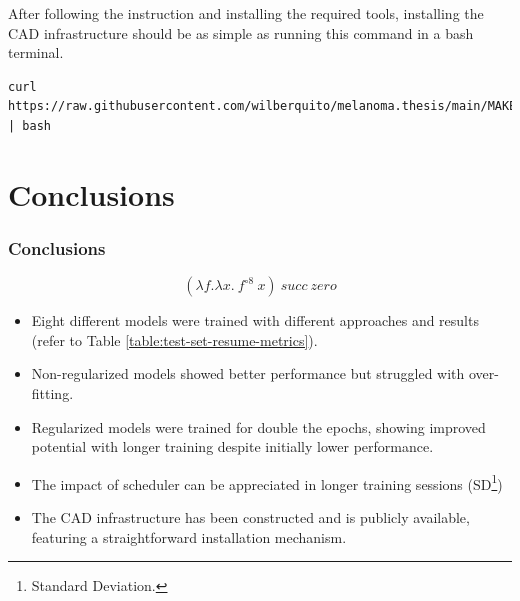\documentclass[dvipsnames,mathserif]{beamer}
\begin{document}
{\begin{frame}[fragile]
      After following the instruction and installing the required tools, installing the CAD infrastructure should
      be as simple as running this command in a bash terminal.

      \vspace{0.1cm}

      \begin{Verbatim}[fontsize=\tiny]
curl https://raw.githubusercontent.com/wilberquito/melanoma.thesis/main/MAKE.sh | bash
      \end{Verbatim}

    \end{frame}


    \section{Conclusions}


    \begin{frame}
      \frametitle{Conclusions}


      \[(\lambda f. \lambda x.\ f^{\circ 8}\ x)\ succ\ zero\]
    \end{frame}

    \begin{frame}
      \begin{itemize}
        \item Eight different models were trained with different approaches and results (refer to Table \ref{table:test-set-resume-metrics}).
        \item Non-regularized models showed better performance but struggled with over-fitting.
        \item Regularized models were trained for double the epochs, showing
          improved potential with longer training despite initially lower
          performance.
        \item The impact of scheduler can be appreciated in longer training sessions (SD\footnote{Standard Deviation.})
        \item The CAD infrastructure has been constructed and is publicly available,
          featuring a straightforward installation mechanism.
      \end{itemize}




\end{frame}}
\end{document}
